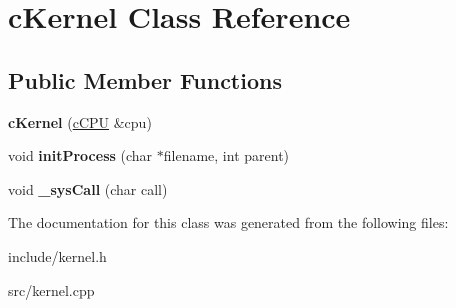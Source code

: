 \hypertarget{classcKernel}{\section{c\-Kernel \-Class \-Reference}
\label{db/da5/classcKernel}
}
\subsection*{\-Public \-Member \-Functions}
\begin{DoxyCompactItemize}
\item 
\hypertarget{classcKernel_ab430160f59d38068d280588b20643453}{{\bfseries c\-Kernel} (\hyperlink{classcCPU}{c\-C\-P\-U} \&cpu)}\label{db/da5/classcKernel_ab430160f59d38068d280588b20643453}

\item 
\hypertarget{classcKernel_a02ba5b5cde6bbab3c71a426dab0ba95f}{void {\bfseries init\-Process} (char $\ast$filename, int parent)}\label{db/da5/classcKernel_a02ba5b5cde6bbab3c71a426dab0ba95f}

\item 
\hypertarget{classcKernel_ae9dd5dd91835a911b96c979ae6347070}{void {\bfseries \-\_\-sys\-Call} (char call)}\label{db/da5/classcKernel_ae9dd5dd91835a911b96c979ae6347070}

\end{DoxyCompactItemize}


\-The documentation for this class was generated from the following files\-:\begin{DoxyCompactItemize}
\item 
include/kernel.\-h\item 
src/kernel.\-cpp\end{DoxyCompactItemize}
